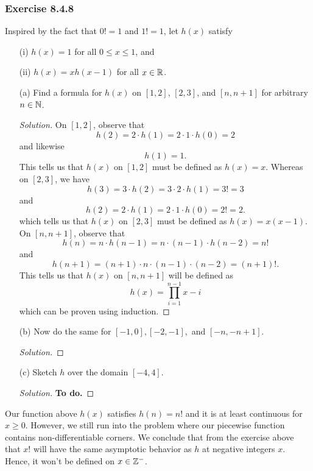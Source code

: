 \subsubsection{Exercise 8.4.8} Inspired by the fact that \( 0! = 1  \) and \( 1! = 1  \), let \( h(x)  \) satisfy 
\begin{enumerate}
    \item[(i)] \( h(x) = 1  \) for all \( 0 \leq x \leq 1  \), and 
    \item[(ii)] \( h(x) = x h(x-1)  \) for all \( x \in \mathbb{R}  \).
\end{enumerate}
\begin{enumerate}
    \item[(a)] Find a formula for \( h(x)  \) on \( [1,2]  \), \( [2,3]  \), and \( [n, n +1 ] \) for arbitrary \( n \in \mathbb{N}  \).
        \begin{proof}[Solution] 
        On \( [1,2]  \), observe that 
        \[  h(2) = 2 \cdot h(1) = 2 \cdot 1 \cdot h(0) = 2 \]
        and likewise 
        \[  h(1) = 1. \] This tells us that \( h(x)  \) on \( [1,2]  \) must be defined as \( h(x) =x  \). Whereas on \( [2,3]  \), we have 
        \[  h(3) = 3 \cdot h(2) = 3 \cdot 2 \cdot h(1) = 3! = 3 \]
        and 
        \[  h(2) = 2 \cdot h(1) = 2 \cdot 1 \cdot h(0) = 2! = 2. \]
        which tells us that \( h(x)  \) on \( [2,3]  \) must be defined as \( h(x) = x (x-1)  \). On \( [n,n+1] \), observe that 
        \[  h(n) = n \cdot h(n-1) = n \cdot (n-1) \cdot h(n-2) = n!  \]
        and  
        \[  h(n+1) = (n+1) \cdot n \cdot (n-1) \cdot (n-2) = (n+1)!. \]
        This tells us that \( h(x)  \) on \( [n,n+1]  \) will be defined as 
        \[  h(x) = \prod_{i=1}^{n-1} x - i\] which can be proven using induction. 
        \end{proof}
    \item[(b)] Now do the same for \( [-1,0], [-2,-1] , \) and \( [-n, -n+1]  \).
        \begin{proof}[Solution] 
        
        \end{proof}
    \item[(c)] Sketch \( h  \) over the domain \( [-4,4]  \).
        \begin{proof}[Solution]
            \textbf{To do.}
        \end{proof}
\end{enumerate}
Our function above \( h(x)  \) satisfies \( h(n) = n!   \) and it is at least continuous for \( x \geq 0  \). However, we still run into the problem where our piecewise function contains non-differentiable corners. We conclude that from the exercise above that \( x!  \) will have the same asymptotic behavior as \( h  \) at negative integers \( x  \). Hence, it won't be defined on \( x \in \mathbb{Z}^{-} \).

